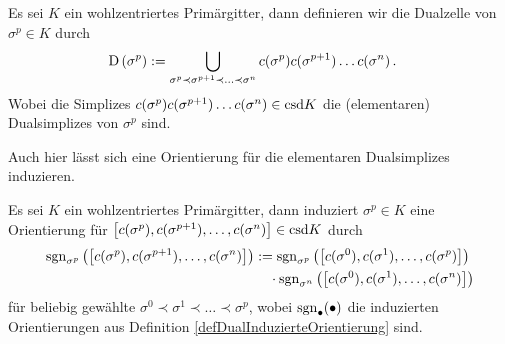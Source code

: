     \begin{definition}
      \label{defDualZelle}
      Es sei \( K \) ein wohlzentriertes Primärgitter, dann definieren wir die Dualzelle von \( \sigma^{p}\in K \) durch
      \begin{align}
        \text{D} \left( \sigma^{p} \right) &:= \bigcup_{\sigma^{p} \prec \sigma^{p+1} \prec \ldots \prec \sigma^{n}}
                                                    c(\sigma^{p}) c(\sigma^{p+1}) \ldots c(\sigma^{n}) \,\text{.}
      \end{align}
      Wobei die Simplizes \( c(\sigma^{p}) c(\sigma^{p+1}) \ldots c(\sigma^{n}) \in \text{csd} K \) die (elementaren) Dualsimplizes von \( \sigma^{p} \) sind.
    \end{definition}
    Auch hier lässt sich eine Orientierung für die elementaren Dualsimplizes induzieren.
    \begin{definition}
      \label{defIndOriElemDual}
      Es sei \( K \) ein wohlzentriertes Primärgitter, dann induziert \( \sigma^{p}\in K \) eine Orientierung für 
      \( \left[ c(\sigma^{p}), c(\sigma^{p+1}), \ldots, c(\sigma^{n}) \right] \in \text{csd} K \) durch
      \begin{align}
      \begin{aligned}
        \mathop{\mathrm{sgn}}\nolimits_{\sigma^{p}} \left( \left[ c(\sigma^{p}), c(\sigma^{p+1}), \ldots, c(\sigma^{n}) \right] \right)
          &:= \mathop{\mathrm{sgn}}\nolimits_{\sigma^{p}}\left( \left[ c(\sigma^{0}), c(\sigma^{1}), \ldots, c(\sigma^{p}) \right] \right)\\
          &\phantom{:=}\cdot \mathop{\mathrm{sgn}}\nolimits_{\sigma^{n}}\left( \left[ c(\sigma^{0}), c(\sigma^{1}), \ldots, c(\sigma^{n}) \right] \right)
      \end{aligned}
      \end{align}
      für beliebig gewählte \( \sigma^{0}\prec \sigma^{1} \prec \ldots \prec \sigma^{p} \), 
      wobei \( \mathop{\mathrm{sgn}}\nolimits_{\bullet}(\bullet) \) die induzierten Orientierungen aus Definition \ref{defDualInduzierteOrientierung} sind.
    \end{definition}
